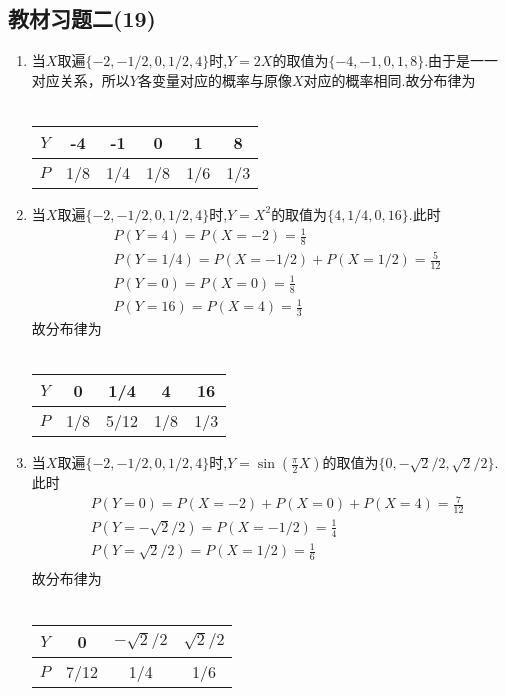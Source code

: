 \documentclass[twocolumn]{article}
\begin{document}
\begin{CJK}{UTF8}{gbsn}
			\section*{教材习题二(19)}
				\begin{enumerate}[(1)]
					\item 当$X$取遍$\{-2,-1/2,0,1/2,4\}$时,$Y=2X$的取值为$\{-4,-1,0,1,8\}$.由于是一一对应关系，所以$Y$各变量对应的概率与原像$X$对应的概率相同.故分布律为\\\\
					\begin{tabular}{c|ccccc}
						$Y$ & -4 & -1 & 0 & 1 & 8 \\
						\hline
						$P$ & 1/8 & 1/4 & 1/8 & 1/6 & 1/3 
					\end{tabular}
					\item 当$X$取遍$\{-2,-1/2,0,1/2,4\}$时,$Y=X^2$的取值为$\{4,1/4,0,16\}$.此时\begin{align*}
						& P(Y=4) = P(X=-2) = \frac{1}{8} \\
						& P(Y=1/4) = P(X=-1/2) + P(X=1/2) = \frac{5}{12} \\
						& P(Y=0) = P(X=0) = \frac{1}{8} \\
						& P(Y=16) = P(X=4) = \frac{1}{3}
					\end{align*}
					故分布律为\\\\
					\begin{tabular}{c|cccc}
						$Y$ & 0 & 1/4 & 4 & 16 \\
						\hline
						$P$ & 1/8 & 5/12 & 1/8 & 1/3 
					\end{tabular}
					\item 当$X$取遍$\{-2,-1/2,0,1/2,4\}$时,$Y=\sin(\frac{\pi}{2}X)$的取值为$\{0,-\sqrt{2}/2,\sqrt{2}/2\}$.此时\begin{align*}
					& P(Y=0) = P(X=-2) + P(X=0) + P(X=4) = \frac{7}{12} \\
					& P(Y=-\sqrt{2}/2) = P(X=-1/2) = \frac{1}{4} \\
					& P(Y=\sqrt{2}/2) = P(X=1/2) = \frac{1}{6} \\
					\end{align*}
					故分布律为\\\\
					\begin{tabular}{c|ccc}
						$Y$ & 0 & $-\sqrt{2}/2$ & $\sqrt{2}/2$ \\
						\hline
						$P$ & 7/12 & 1/4 & 1/6 
					\end{tabular}
				\end{enumerate}

\end{CJK}
\end{document}
